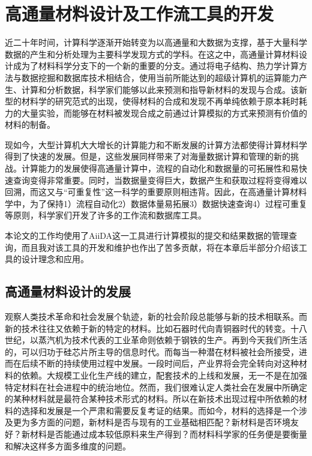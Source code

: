 \chapter{高通量材料设计及工作流工具的开发}\label{chapter:workflows}

近二十年时间，计算科学逐渐开始转变为以高通量和大数据为支撑，基于大量科学数据的产生和分析处理为主要科学发现方式的学科。在这之中，高通量计算材料设计成为了材料科学分支下的一个新的重要的分支。通过将电子结构、热力学计算方法与数据挖掘和数据库技术相结合，使用当前所能达到的超级计算机的运算能力产生、计算和分析数据，科学家们能够以此来预测和指导新材料的发现与合成。该新型的材料学的研究范式的出现，使得材料的合成和发现不再单纯依赖于原本耗时耗力的大量实验，而能够在材料被发现合成之前通过计算模拟的方式来预测有价值的材料的制备。

现如今，大型计算机大大增长的计算能力和不断发展的计算方法都使得计算材料学得到了快速的发展。但是，这些发展同样带来了对海量数据计算和管理的新的挑战。计算能力的发展使得高通量计算中，流程的自动化和数据量的可拓展性和易快速查询变得非常重要。同时，当数据量变得巨大，数据产生和获取过程将变得难以回溯，而这又与“可重复性”这一科学的重要原则相违背。因此，在高通量计算材料学中，为了保持1）流程自动化2）数据体量易拓展3）数据快速查询4）过程可重复等原则，科学家们开发了许多的工作流和数据库工具。

本论文的工作均使用了AiiDA\cite{pizzi2016aiida,huber2020aiida}这一工具进行计算模拟的提交和结果数据的管理查询，而且我对该工具的开发和维护也作出了苦多贡献，将在本章后半部分介绍该工具的设计理念和应用。

\section{高通量材料设计的发展}
观察人类技术革命和社会发展个轨迹，新的社会阶段总能够与新的技术相联系。而新的技术往往又依赖于新的特定的材料。比如石器时代向青铜器时代的转变。十八世纪，以蒸汽机为技术代表的工业革命则依赖于钢铁的生产。再到今天我们所生活的，可以归功于硅芯片所主导的信息时代。而每当一种潜在材料被社会所接受，进而在后续不断的持续使用过程中发展。一段时间后，产业界将会完全转向对这种材料的依赖。大规模工业化生产线的建立，配套技术的上线和发展，无一不是在加强特定材料在社会进程中的统治地位。然而，我们很难认定人类社会在发展中所确定的某种材料就是最符合某种技术形式的材料。所以在新技术出现过程中所依赖的材料的选择和发展是一个严肃和需要反复考证的结果。而如今，材料的选择是一个涉及更为多方面的问题，新材料是否与现有的工业基础相匹配？新材料是否环境友好？新材料是否能通过成本较低原料来生产得到？而材料科学家的任务便是要衡量和解决这样多方面多维度的问题。


